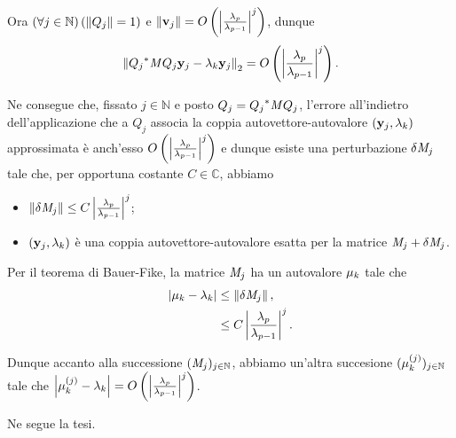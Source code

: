 \par Ora $\ForAll{j \in \mathbb{N}}{\Norm{Q_j} = 1}$ e
$\Norm{\Vector_j}
= \BigO{\AbsoluteValue{\frac{\Eigenvalue_p}{\Eigenvalue_{p - 1}}}^j}$,
dunque
\[
  \Norm{
  \HermitianTransposed{Q_j} \Matrix Q_j \VarEigenvector_j
  - \Eigenvalue_k \VarEigenvector_j
  }[2]
  = \BigO{\AbsoluteValue{\frac{\Eigenvalue_p}{\Eigenvalue_{p - 1}}}^j}.
\]
\par Ne consegue che, fissato $j \in \mathbb{N}$ e posto
$Q_j = {Q_j}^* \mathit{M} Q_j$,
l'errore all'indietro dell'applicazione che a
$Q_j$ associa la coppia autovettore-autovalore
$(\VarEigenvector_j,\Eigenvalue_k)$ approssimata \`e anch'esso
$O \left ( \left \lvert \frac{\lambda_p}{\lambda_{p - 1}} \right \rvert^j \right )$ e dunque esiste
una perturbazione $\Perturbation{\Matrix_j}$ tale che, per opportuna costante $C \in \mathbb{C}$, abbiamo
\begin{itemize}
  \item $\Norm{\Perturbation{\Matrix_j}}
    \leq C \AbsoluteValue{\frac{\Eigenvalue_p}{\Eigenvalue_{p - 1}}}^j$;
  \item $(\VarEigenvector_j,\Eigenvalue_k)$ \`e una coppia autovettore-autovalore esatta
    per la matrice $\Matrix_j + \Perturbation{\Matrix_j}$.
\end{itemize}
\par Per il teorema di Bauer-Fike, la matrice $\mathit{M}_j$ ha un autovalore
$\mu_k$ tale che
\begin{align*}
  \AbsoluteValue{\VarEigenvalue_k - \Eigenvalue_k}
  &\leq \Norm{\Perturbation{\Matrix_j}},\\
  &\leq C \AbsoluteValue{\frac{\Eigenvalue_p}{\Eigenvalue_{p - 1}}}^j.
\end{align*}
\par Dunque accanto alla successione $(\mathit{M}_j)_{j \in \mathbb{N}}$, abbiamo
un'altra succesione $(\mu_k^{(j)})_{j \in \mathbb{N}}$ tale che
$\left \lvert \mu_k^{(j)} - \lambda_k \right \rvert
= O \left ( \left \lvert \frac{\lambda_p}{\lambda_{p - 1}} \right \rvert^j \right )$.
\par Ne segue la tesi. \EndProof

